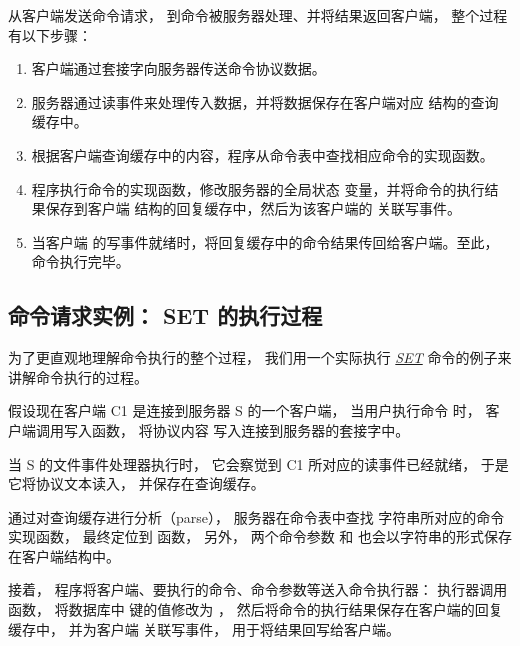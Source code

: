 \documentclass[a4paper,11pt,english]{sphinxmanual}
\begin{document}
从客户端发送命令请求，
到命令被服务器处理、并将结果返回客户端，
整个过程有以下步骤：
\begin{enumerate}
\item {} 
客户端通过套接字向服务器传送命令协议数据。

\item {} 
服务器通过读事件来处理传入数据，并将数据保存在客户端对应  结构的查询缓存中。

\item {} 
根据客户端查询缓存中的内容，程序从命令表中查找相应命令的实现函数。

\item {} 
程序执行命令的实现函数，修改服务器的全局状态  变量，并将命令的执行结果保存到客户端  结构的回复缓存中，然后为该客户端的  关联写事件。

\item {} 
当客户端  的写事件就绪时，将回复缓存中的命令结果传回给客户端。至此，命令执行完毕。

\end{enumerate}


\subsection{命令请求实例： SET 的执行过程}
\label{internal/redis:set}
为了更直观地理解命令执行的整个过程，
我们用一个实际执行 \href{http://redis.readthedocs.org/en/latest/string/set.html\#set}{\emph{SET}} 命令的例子来讲解命令执行的过程。

假设现在客户端 C1 是连接到服务器 S 的一个客户端，
当用户执行命令  时，
客户端调用写入函数，
将协议内容  写入连接到服务器的套接字中。

当 S 的文件事件处理器执行时，
它会察觉到 C1 所对应的读事件已经就绪，
于是它将协议文本读入，
并保存在查询缓存。

通过对查询缓存进行分析（parse），
服务器在命令表中查找  字符串所对应的命令实现函数，
最终定位到  函数，
另外，
两个命令参数  和  也会以字符串的形式保存在客户端结构中。

接着，
程序将客户端、要执行的命令、命令参数等送入命令执行器：
执行器调用  函数，
将数据库中  键的值修改为  ，
然后将命令的执行结果保存在客户端的回复缓存中，
并为客户端  关联写事件，
用于将结果回写给客户端。
\end{document}
